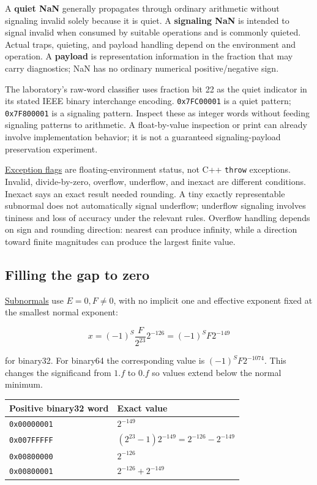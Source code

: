 A \textbf{quiet NaN} generally propagates through ordinary arithmetic without signaling invalid solely because it is quiet. A \textbf{signaling NaN} is intended to signal invalid when consumed by suitable operations and is commonly quieted. Actual traps, quieting, and payload handling depend on the environment and operation. A \textbf{payload} is representation information in the fraction that may carry diagnostics; NaN has no ordinary numerical positive/negative sign.

The laboratory's raw-word classifier uses fraction bit 22 as the quiet indicator in its stated IEEE binary interchange encoding. \texttt{0x7FC00001} is a quiet pattern; \texttt{0x7F800001} is a signaling pattern. Inspect these as integer words without feeding signaling patterns to arithmetic. A float-by-value inspection or print can already involve implementation behavior; it is not a guaranteed signaling-payload preservation experiment.

\hyperref[appendix-ed8531b46754]{Exception flags} are floating-environment status, not C++ \texttt{throw} exceptions. Invalid, divide-by-zero, overflow, underflow, and inexact are different conditions. Inexact says an exact result needed rounding. A tiny exactly representable subnormal does not automatically signal underflow; underflow signaling involves tininess and loss of accuracy under the relevant rules. Overflow handling depends on sign and rounding direction: nearest can produce infinity, while a direction toward finite magnitudes can produce the largest finite value.

\subsection{Filling the gap to zero}\label{01-foundations-i-ch001-filling-the-gap-to-zero}

\hyperref[appendix-00a6e044c437]{Subnormals} use \(E=0,F\ne0\), with no implicit one and effective exponent fixed at the smallest normal exponent:

\[
x=(-1)^S\frac{F}{2^{23}}2^{-126}=(-1)^S F2^{-149}
\]

for binary32. For binary64 the corresponding value is \((-1)^S F2^{-1074}\). This changes the significand from \(1.f\) to \(0.f\) so values extend below the normal minimum.

{\def\LTcaptype{none} %
\begin{longtable}[]{@{}ll@{}}
\toprule\noalign{}
Positive binary32 word & Exact value \\
\midrule\noalign{}
\endhead
\bottomrule\noalign{}
\endlastfoot
\texttt{0x00000001} & \(2^{-149}\) \\
\texttt{0x007FFFFF} & \((2^{23}-1)2^{-149}=2^{-126}-2^{-149}\) \\
\texttt{0x00800000} & \(2^{-126}\) \\
\texttt{0x00800001} & \(2^{-126}+2^{-149}\) \\
\end{longtable}
}

